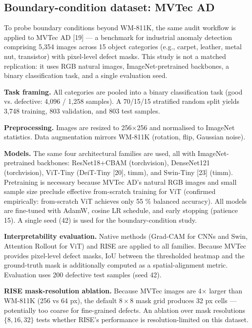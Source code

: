 \documentclass[11pt,a4paper]{article}
\begin{document}
\subsection{Boundary-condition dataset: MVTec AD}

To probe boundary conditions beyond WM-811K, the same audit workflow is applied to MVTec AD [19] --- a benchmark for industrial anomaly detection comprising 5,354 images across 15 object categories (e.g., carpet, leather, metal nut, transistor) with pixel-level defect masks. This study is not a matched replication: it uses RGB natural images, ImageNet-pretrained backbones, a binary classification task, and a single evaluation seed.

\textbf{Task framing.} All categories are pooled into a binary classification task (good vs. defective: 4,096 / 1,258 samples). A 70/15/15 stratified random split yields 3,748 training, 803 validation, and 803 test samples.

\textbf{Preprocessing.} Images are resized to 256$\times$256 and normalised to ImageNet statistics. Data augmentation mirrors WM-811K (rotation, flip, Gaussian noise).

\textbf{Models.} The same four architectural families are used, all with ImageNet-pretrained backbones: ResNet18+CBAM (torchvision), DenseNet121 (torchvision), ViT-Tiny (DeiT-Tiny [20], timm), and Swin-Tiny [23] (timm). Pretraining is necessary because MVTec AD's natural RGB images and small sample size preclude effective from-scratch training for ViT (confirmed empirically: from-scratch ViT achieves only 55 \% balanced accuracy). All models are fine-tuned with AdamW, cosine LR schedule, and early stopping (patience 15). A single seed (42) is used for the boundary-condition study.

\textbf{Interpretability evaluation.} Native methods (Grad-CAM for CNNs and Swin, Attention Rollout for ViT) and RISE are applied to all families. Because MVTec provides pixel-level defect masks, IoU between the thresholded heatmap and the ground-truth mask is additionally computed as a spatial-alignment metric. Evaluation uses 200 defective test samples (seed 42).

\textbf{RISE mask-resolution ablation.} Because MVTec images are 4$\times$ larger than WM-811K (256 vs 64 px), the default $8{\times}8$ mask grid produces 32 px cells --- potentially too coarse for fine-grained defects. An ablation over mask resolutions $\{8, 16, 32\}$ tests whether RISE's performance is resolution-limited on this dataset.
\end{document}
